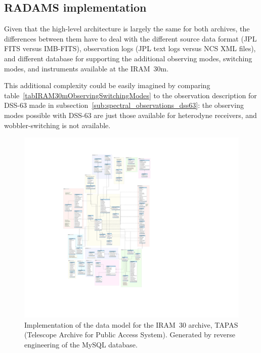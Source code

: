 		
		\subsection{RADAMS implementation} %
		\label{sub:radams_implementation_iram}
			
			Given that the high-level architecture is
			largely the same for both archives, the differences
			between them have to deal with the different
			source data format (JPL FITS versus IMB-FITS), 
			observation logs (JPL text logs versus NCS XML files),
			and different database for supporting the additional
			observing modes, switching modes, and instruments
			available at the IRAM~30m.
			
			This additional complexity could be easily imagined by
			comparing table~\ref{tabIRAM30mObservingSwitchingModes}
			to the observation description for DSS-63 made in
			subsection~\ref{sub:spectral_observations_dss63}: the
			observing modes possible with DSS-63 are just those
			available for heterodyne receivers, and 
			wobbler-switching is not available.
			
			\begin{figure}[tbp]
				\centering
					\includegraphics[totalheight=1.1\textheight]
					{fig/tapas-dm.pdf}
				\caption[Implementation of the data model for the
				IRAM~30m archive]
				{
					Implementation of the data model for the
					IRAM~30 archive, TAPAS (Telescope Archive
					for Public Access System). Generated by reverse
					engineering of the MySQL database.
				}
				\label{fig:fig_iram30m-data-model}
			\end{figure}
			
